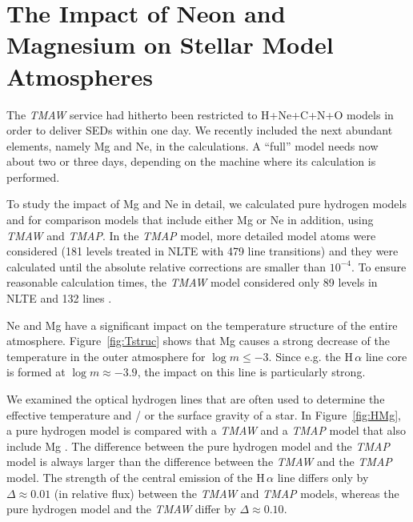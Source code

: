 \section{The Impact of Neon and Magnesium on Stellar Model Atmospheres}
\label{sect:nemg}

The \emph{TMAW} service had hitherto been restricted to H+Ne+C+N+O models in order to deliver SEDs within one day. We recently included the next abundant elements, namely Mg and Ne, in the calculations. A ``full'' model needs now about two or three days, depending on the machine where its calculation is performed.

To study the impact of Mg and Ne in detail, we calculated pure hydrogen models and for comparison models that include either Mg or Ne in addition, using \emph{TMAW} and \emph{TMAP}. In the \emph{TMAP} model, more detailed model atoms were considered (181 levels treated in NLTE with 479 line transitions) and they were calculated until the absolute relative corrections are smaller than $10^{-4}$. To ensure reasonable calculation times,  the \emph{TMAW} model considered only 89 levels in NLTE and 132 lines \citep[cf\@.][]{rauchringat2012}.

Ne and Mg have a significant impact on the temperature structure of the entire atmosphere. Figure~\ref{fig:Tstruc} shows that Mg causes a strong decrease of the temperature in the outer atmosphere for $\log m \leq -3$. Since e.g\@. the H\,$\alpha$ line core is formed at $\log m \approx -3.9$, the impact on this line is particularly strong.

We examined the optical hydrogen lines that are often used to determine the effective temperature and / or the surface gravity of a star. In Figure~\ref{fig:HMg}, a pure hydrogen model is compared with a \emph{TMAW} and a \emph{TMAP} model that also include Mg \citep[$T_\mathrm{eff}=60\,\mathrm{kK}$, $\log g = 7$, solar abundances,][]{asplundetal2009}. The difference between the pure hydrogen model and the  \emph{TMAP} model is always larger than the difference between the \emph{TMAW} and the \emph{TMAP} model. The strength of the central emission of the H\,$\alpha$ line differs only by $\Delta \approx 0.01$ (in relative flux) between the \emph{TMAW} and \emph{TMAP} models, whereas the pure hydrogen model and the \emph{TMAW} differ by $\Delta \approx 0.10$.


